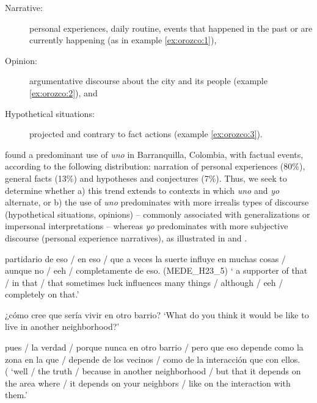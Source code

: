 \documentclass[output=paper]{langscibook}
\begin{document}
\begin{description}
   \item[Narrative:] personal experiences, daily routine, events that happened in the past or are currently happening (as in example \ref{ex:orozco:1}), 
   \item[Opinion:] argumentative discourse about the city and its people (example \ref{ex:orozco:2}), and 
   \item[Hypothetical situations:] projected and contrary to fact actions (example \ref{ex:orozco:3}). 
\end{description}


\citet[53]{HurtadoOrtega-Santos2019} found a predominant use of \textit{uno} in Barranquilla, Colombia, with factual events, according to the following distribution: narration of personal experiences (80\%), general facts (13\%) and hypotheses and conjectures (7\%). Thus, we seek to determine whether a) this trend extends to contexts in which \textit{uno} and \textit{yo} alternate, or b) the use of \textit{uno} predominates with more irrealis types of discourse (hypothetical situations, opinions) – commonly associated with generalizations or impersonal interpretations – whereas \textit{yo} predominates with more subjective discourse (personal experience narratives), as illustrated in  and .


\eanoraggedright\label{ex:orozco:2}
 partidario de eso /  en eso / que a veces la suerte influye en muchas cosas / aunque no  / eeh / completamente de eso. (MEDE\_H23\_5) 
\glt ‘ a supporter of that /   in that / that sometimes luck influences many things / although    / eeh / completely on that.’
\ex\label{ex:orozco:3}
\begin{xlist}
 ¿cómo cree que sería vivir en otro barrio?
\glt ‘What do you think it would be like to live in another neighborhood?’

  pues / la verdad  / porque nunca  en otro barrio / pero   que eso depende como la zona en la que   / depende de los vecinos / como de la interacción que   con ellos.\\(
\glt ‘well / the truth  / because  in another neighborhood / but  that it depends on the area where  / it depends on your neighbors / like on the interaction  with them.’
\end{xlist}
\z 
\end{document}
